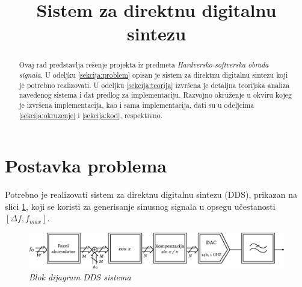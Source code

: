 \documentclass[conference]{IEEEtran}
\begin{document}
\title{Sistem za direktnu digitalnu sintezu}

\author{
\and
{}
}

\maketitle

\begin{abstract}
Ovaj rad predstavlja rešenje projekta iz predmeta \textsl{Hardversko-softverska obrada signala}. U odeljku \ref{sekcija:problem} opisan je sistem za direktnu digitalnu sintezu koji je potrebno realizovati. U odeljku \ref{sekcija:teorija} izvršena je detaljna teorijska analiza navedenog sistema i dat predlog za implementaciju. Razvojno okruženje u okviru kojeg je izvršena implementacija, kao i sama implementacija, dati su u odeljcima \ref{sekcija:okruzenje} i \ref{sekcija:kod}, respektivno.
\end{abstract}

\section{Postavka problema}\label{sekcija:problem}
Potrebno je realizovati sistem za direktnu digitalnu sintezu (DDS), prikazan na slici \ref{slika:dds}, koji se koristi za generisanje sinusnog signala u opsegu učestanosti $[\Delta f, f_{max}]$.

\begin{figure}[h]
	\centering
	\includegraphics[scale=0.43]{./slike/dds.eps}
	\caption{\textsl{Blok dijagram DDS sistema}}
	\label{slika:dds}
\end{figure}
\end{document}

